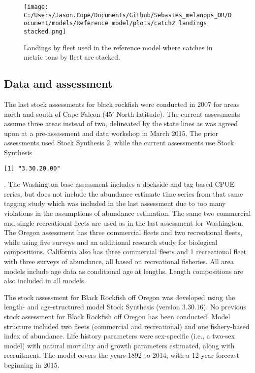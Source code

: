 \documentclass[11pt,
  english,
  letterpaper,
]{article}
\begin{document}


\begin{figure}
\centering
\texttt{[image: C:/Users/Jason.Cope/Documents/Github/Sebastes\_melanops\_OR/Document/models/Reference model/plots/catch2 landings stacked.png]}
\caption{Landings by fleet used in the reference model where catches in metric tons by fleet are stacked.\label{fig:es-catch}}
\end{figure}

\clearpage

\hypertarget{data-and-assessment}{%
\subsection*{Data and assessment}\label{data-and-assessment}}

The last stock assessments for black rockfish were conducted in 2007 for areas north and south of Cape Falcon (45' North latitude). The current assessments assume three areas instead of two, delineated by the state lines as was agreed upon at a pre-assessment and data workshop in March 2015. The prior assessments used Stock Synthesis 2, while the current assessments use Stock Synthesis

\begin{verbatim}
[1] "3.30.20.00"
\end{verbatim}

. The Washington base assessment includes a dockside and tag-based CPUE series, but does not include the abundance estimate time series from that same tagging study which was included in the last assessment due to too many violations in the assumptions of abundance estimation. The same two commercial and single recreational fleets are used as in the last assessment for Washington. The Oregon assessment has three commercial fleets and two recreational fleets, while using five surveys and an additional research study for biological compositions. California also has three commercial fleets and 1 recreational fleet with three surveys of abundance, all based on recreational fisheries. All area models include age data as conditional age at lengths. Length compositions are also included in all models.

The stock assessment for Black Rockfish off Oregon was developed using the length- and age-structured model Stock Synthesis (version 3.30.16). No previous stock assessment for Black Rockfish off Oregon has been conducted. Model structure included two fleets (commercial and recreational) and one fishery-based index of abundance. Life history parameters were sex-specific (i.e., a two-sex model) with natural mortality and growth parameters estimated, along with recruitment. The model covers the years 1892 to 2014, with a 12 year forecast beginning in 2015.
\end{document}
